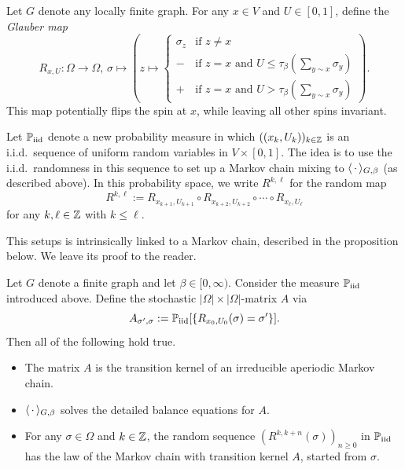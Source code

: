 \begin{definition}
    Let $G$ denote any locally finite graph.
    For any $x\in V$ and $U\in[0,1]$, define the \emph{Glauber map}
    \[
        R_{x,U}:\Omega\to\Omega,\,\sigma\mapsto
        \left(
            z\mapsto
            \begin{cases}
                \sigma_z&\text{if $z\neq x$}\\
                - &\text{if $z=x$ and $U\leq \tau_\beta(\sum_{y\sim x}\sigma_y)$}\\
                + &\text{if $z=x$ and $U>\tau_\beta(\sum_{y\sim x}\sigma_y)$}
            \end{cases}
        \right).
    \]
    This map potentially flips the spin at $x$, while leaving all other spins invariant.
\end{definition}

\newcommand\Piid{\P_{\operatorname{iid}}}

Let $\Piid$ denote a new probability measure in which
$((x_k,U_k))_{k\in\mathbb Z}$ is an i.i.d.\ sequence of
uniform random variables in $V\times[0,1]$.
The idea is to use the i.i.d.\ randomness in this sequence to set up a Markov chain
mixing to $\langle\,\cdot\,\rangle_{G,\beta}$ (as described above).
In this probability space, we write $R^{k,\ell}$ for the random map
\[
    R^{k,\ell}:=R_{x_{k+1},U_{k+1}}\circ R_{x_{k+2},U_{k+2}} \circ \cdots \circ
    R_{x_{\ell},U_{\ell}}
\]
for any $k,\ell\in\mathbb Z$ with $k\leq\ell$.

This setups is intrinsically linked to a Markov chain, described in the proposition below.
We leave its proof to the reader.

\begin{proposition}
    Let $G$ denote a finite graph and let $\beta\in[0,\infty)$.
    Consider the measure $\Piid$ introduced above.
    Define the stochastic $|\Omega|\times|\Omega|$-matrix $A$ via
    \[
        A_{\sigma',\sigma}:=\Piid[\{R_{x_0,U_0}(\sigma)=\sigma'\}].
    \]
    Then all of the following hold true.
    \begin{itemize}
        \item The matrix $A$ is the transition kernel of an irreducible aperiodic Markov chain.
        \item $\langle\,\cdot\,\rangle_{G,\beta}$ solves the detailed balance equations for $A$.
        \item For any $\sigma\in\Omega$ and $k\in\mathbb Z$, the random sequence
            \(
                (R^{k,k+n}(\sigma))_{n\geq 0}
            \)
            in $\Piid$
            has the law of the Markov chain with transition kernel $A$, started from $\sigma$.
    \end{itemize}
\end{proposition}

